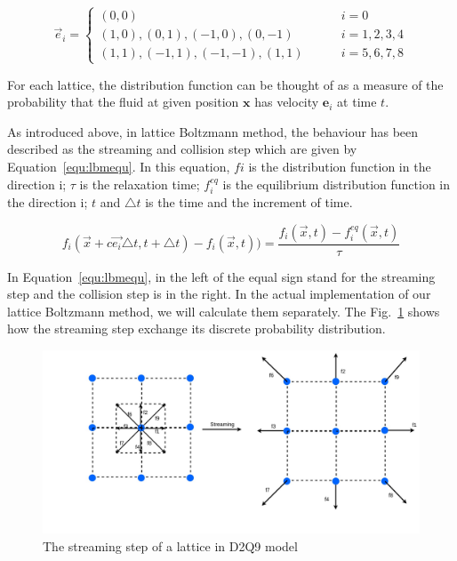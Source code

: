 \begin{equation}
\label{equ:d2q9}
    \vec{e}_{i} = \left\{\begin{matrix}
(0,0) \qquad\qquad\qquad\qquad\qquad\qquad &i=0 \\ 
(1,0), (0,1), (-1,0), (0,-1)\quad\qquad &i=1,2,3,4 \\ 
(1,1), (-1,1), (-1,-1), (1,1)\qquad & i=5,6,7,8
\end{matrix}\right.
\end{equation}

For each lattice, the distribution function can be thought of as a measure of the probability that the fluid at given position $\mathbf{x}$ has velocity $\mathbf{e}_i$ at time $t$.

As introduced above, in lattice Boltzmann method, the behaviour has been described as the streaming and collision step which are given by Equation~\ref{equ:lbmequ}. In this equation, $fi$ is the distribution function in the direction i; $\tau$ is the relaxation time; $f_i^{eq}$ is the equilibrium distribution function in the direction i; $t$ and $\triangle t$ is the time and the increment of time.

\begin{equation}
\label{equ:lbmequ}
f_i(\vec{x}+c\vec{e_i}\triangle t, t+\triangle t) - f_i(\vec x,t)) = \frac{f_i(\vec x, t) - f_i^{eq}(\vec x , t)}{\tau}
\end{equation}




In Equation~\ref{equ:lbmequ}, in the left of the equal sign stand for the streaming step and the collision step is in the right. In the actual implementation of our lattice Boltzmann method, we will calculate them separately. The Fig.~\ref{fig:stream} shows how the streaming step exchange its discrete probability distribution.


\begin{figure}[!tb]
   \centering
       \includegraphics[width=1\textwidth]{figures/stream.jpg}
       \caption{The streaming step of a lattice in D2Q9 model}
       \label{fig:stream}
\end{figure}

